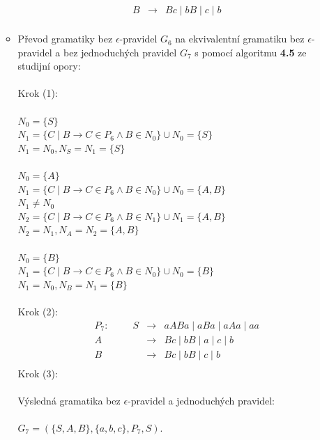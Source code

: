 \documentclass[a4paper,11pt]{article}[24.3.2010]
\begin{document}
\begin{enumerate}
\begin{itemize}
\begin{eqnarray*}
      B&\rightarrow&Bc \mid bB \mid c \mid b\\
      \end{eqnarray*}
      \newpage
      \item Převod gramatiky bez $\epsilon$-pravidel $G_{6}$ na ekvivalentní gramatiku bez $\epsilon$-pravidel a bez jednoduchých pravidel  $G_{7}$ s pomocí algoritmu \textbf{4.5} ze studijní opory:\\\\
      Krok (1):\\\\
     $N_{0} = \{S\}$\\
     $N_{1} = \{C \mid B \rightarrow C \in P_{6} \wedge B \in N_{0}\} \cup N_{0} = \{S\}$\\
     $N_{1} = N_{0},  N_{S} = N_{1} = \{S\}$\\\\
     $N_{0} = \{A\}$\\
     $N_{1} = \{C \mid B \rightarrow C \in P_{6} \wedge B \in N_{0}\} \cup N_{0} = \{A,B\}$\\
     $N_{1} \neq N_{0}$\\
     $N_{2} = \{C \mid B \rightarrow C \in P_{6} \wedge B \in N_{1}\} \cup N_{1} = \{A,B\}$\\
     $N_{2} = N_{1},  N_{A} = N_{2} = \{A,B\}$\\\\
     $N_{0} = \{B\}$\\
     $N_{1} = \{C \mid B \rightarrow C \in P_{6} \wedge B \in N_{0}\} \cup N_{0} = \{B\}$\\
     $N_{1} = N_{0},  N_{B} = N_{1} = \{B\}$\\\\
      Krok (2):\\
      \begin{eqnarray*}
      P_{7}: \:\:\:\:\:\:\:\:\:\:\: S&\rightarrow&aABa \mid aBa \mid aAa \mid aa\\
      A&\rightarrow&Bc \mid bB \mid a \mid c \mid b\\
      B&\rightarrow&Bc \mid bB \mid c \mid b\\
      \end{eqnarray*}
      Krok (3):\\\\
      Výsledná gramatika bez $\epsilon$-pravidel a jednoduchých pravidel:\\\\ $G_{7} = (\{S,A,B\},\{a,b,c\},P_{7},S)$.\\
      \newpage

\end{itemize}
\end{enumerate}
\end{document}
